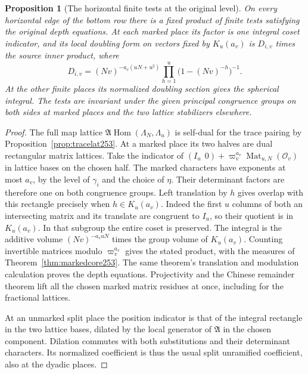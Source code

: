 \documentclass[a4paper,11pt]{article}
\newtheorem{proposition}{Proposition}[section]
\theoremstyle{definition}
\theoremstyle{remark}
\numberwithin{equation}{section}
\begin{document}
\begin{proposition}[The horizontal finite tests at the original level]\leavevmode
\label{prop:rowfinite262}
On every horizontal edge of the bottom row there is a fixed
product of finite tests satisfying the original depth equations.
At each marked place its factor is one integral coset indicator,
and its local doubling form on vectors fixed by \(K_u(a_v)\)
is \(D_{i,v}\) times the source inner product, where
\[
 D_{i,v}=(Nv)^{-a_v(uN+u^2)}
                \prod_{h=1}^{u}\bigl(1-(Nv)^{-h}\bigr)^{-1}.
\]
At the other finite places its normalized doubling section gives
the spherical integral. The tests are invariant under the given
principal congruence groups on both sides at marked places
and the two lattice stabilizers elsewhere.
\end{proposition}
\begin{proof}
The full map lattice
\(\mathfrak A\operatorname{Hom}(\Lambda_N,\Lambda_u)\) is
self-dual for the trace pairing by
Proposition~\ref{prop:tracelat253}. At a marked place its two
halves are dual rectangular matrix lattices. Take the indicator
of \((I_u\ \ 0)+\varpi_v^{a_v}\operatorname{Mat}_{u,N}(\mathcal O_v)\)
in lattice bases on the chosen half. The marked characters have
exponents at most \(a_v\), by the level of \(\gamma_i\) and the
choice of \(\eta\). Their determinant factors are therefore
one on both congruence groups. Left translation by \(h\) gives
overlap with this rectangle precisely when \(h\in K_u(a_v)\).
Indeed the first \(u\) columns of both an intersecting matrix
and its translate are congruent to \(I_u\), so their quotient
is in \(K_u(a_v)\). In that subgroup the entire coset is
preserved. The integral is the additive volume \((Nv)^{-a_vuN}\)
times the group volume of \(K_u(a_v)\). Counting invertible
matrices modulo \(\varpi_v^{a_v}\) gives the stated product,
with the measures of Theorem~\ref{thm:markedcore253}. The same
theorem's translation and modulation calculation proves the
depth equations. Projectivity and the Chinese remainder theorem
lift all the chosen marked matrix residues at once, including
for the fractional lattices.

At an unmarked split place the position indicator is that of
the integral rectangle in the two lattice bases, dilated by
the local generator of \(\mathfrak A\) in the chosen component.
Dilation commutes with both substitutions and their determinant
characters. Its normalized coefficient is thus the usual split
unramified coefficient, also at the dyadic places.


\end{proof}
\end{document}
